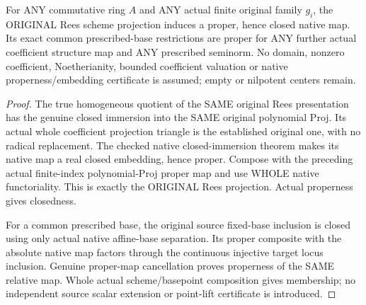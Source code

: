 \begin{theorem}
\label{scheme:original-finite-rees-native-proper}
\leanok
{}
For ANY commutative ring $A$ and ANY actual finite original family $g_i$, the
ORIGINAL Rees scheme projection induces a proper, hence closed native map.
Its exact common prescribed-base restrictions are proper for ANY further
actual coefficient structure map and ANY prescribed seminorm. No domain,
nonzero coefficient, Noetherianity, bounded coefficient valuation or native
properness/embedding certificate is assumed; empty or nilpotent centers remain.
\end{theorem}
\begin{proof}
The true homogeneous quotient of the SAME original Rees presentation has the
genuine closed immersion into the SAME original polynomial Proj. Its actual
whole coefficient projection triangle is the established original one, with
no radical replacement. The checked native closed-immersion theorem makes
its native map a real closed embedding, hence proper. Compose with the preceding
actual finite-index polynomial-Proj proper map and use WHOLE native functoriality.
This is exactly the ORIGINAL Rees projection. Actual properness gives closedness.

For a common prescribed base, the original source fixed-base inclusion is closed
using only actual native affine-base separation. Its proper composite with
the absolute native map factors through the continuous injective target locus
inclusion. Genuine proper-map cancellation proves properness of the SAME
relative map. Whole actual scheme/basepoint composition gives membership; no
independent source scalar extension or point-lift certificate is introduced.
\end{proof}
